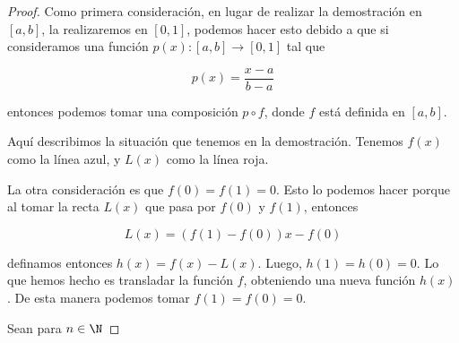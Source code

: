 \begin{proof}
    Como primera consideración, en lugar de realizar la demostración en $[a,b]$, la realizaremos en $[0,1]$, podemos hacer esto debido a que si consideramos una función $p(x): [a,b] \rightarrow [0,1]$ tal que
    
    \[
    p(x) = \frac{x-a}{b-a}
    \]
    
    \noindent entonces podemos tomar una composición $p \circ f$, donde $f$ está definida en $[a,b]$.
    
    \begin{marginfigure}
        \centering
        \label{fig:stnwei1}
        \caption{\footnotesize Aquí describimos la situación que tenemos en la demostración. Tenemos $f(x)$ como la línea azul, y $L(x)$ como la línea roja.}
    \end{marginfigure}
    
    La otra consideración es que $f(0) = f(1) = 0$. Esto lo podemos hacer porque al tomar la recta $L(x)$ que pasa por $f(0)$ y $f(1)$, entonces
    
    \[
    L(x) = (f(1) - f(0))x - f(0)
    \]
    
    \noindent definamos entonces $h(x) = f(x) - L(x)$. Luego, $h(1) = h(0) = 0$. Lo que hemos hecho es transladar la función $f$, obteniendo una nueva función $h(x)$. De esta manera podemos tomar $f(1) = f(0) = 0$.
    
    Sean para $n \in \N$
    

\end{proof}
